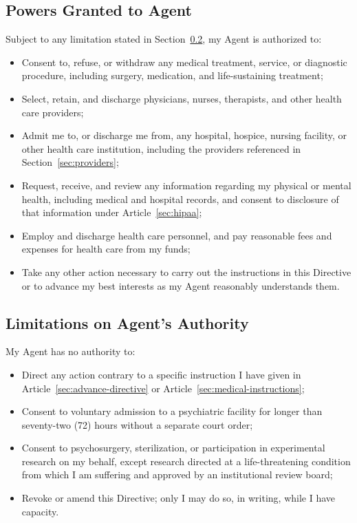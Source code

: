 \subsection{Powers Granted to Agent}
Subject to any limitation stated in Section~\ref{sec:limitations}, my Agent is authorized to:
\begin{itemize}[label=\textbullet,leftmargin=1.4em,itemsep=1.5pt,topsep=2pt]
\item Consent to, refuse, or withdraw any medical treatment, service, or diagnostic procedure, including surgery, medication, and life-sustaining treatment;
\item Select, retain, and discharge physicians, nurses, therapists, and other health care providers;
\item Admit me to, or discharge me from, any hospital, hospice, nursing facility, or other health care institution, including the providers referenced in Section~\ref{sec:providers};
\item Request, receive, and review any information regarding my physical or mental health, including medical and hospital records, and consent to disclosure of that information under Article~\ref{sec:hipaa};
\item Employ and discharge health care personnel, and pay reasonable fees and expenses for health care from my funds;
\item Take any other action necessary to carry out the instructions in this Directive or to advance my best interests as my Agent reasonably understands them.
\end{itemize}

\subsection{Limitations on Agent's Authority}
\label{sec:limitations}
My Agent has no authority to:
\begin{itemize}[label=\textbullet,leftmargin=1.4em,itemsep=1.5pt,topsep=2pt]
\item Direct any action contrary to a specific instruction I have given in Article~\ref{sec:advance-directive} or Article~\ref{sec:medical-instructions};
\item Consent to voluntary admission to a psychiatric facility for longer than seventy-two (72) hours without a separate court order;
\item Consent to psychosurgery, sterilization, or participation in experimental research on my behalf, except research directed at a life-threatening condition from which I am suffering and approved by an institutional review board;
\item Revoke or amend this Directive; only I may do so, in writing, while I have capacity.
\end{itemize}

